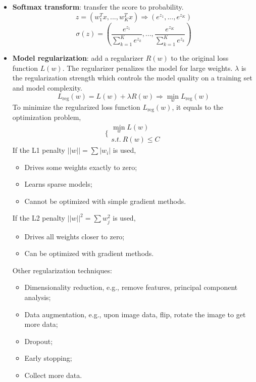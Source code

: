 \documentclass[]{article}
\begin{document}
\begin{itemize}
\begin{itemize}
		\item \textbf{Softmax transform}: transfer the score to probability.
		\begin{equation}
		z=(w_1^Tx, ..., w_K^Tx)\Rightarrow (e^{z_1}, ..., e^{z_K})
		\end{equation}
		\begin{equation}
		\sigma (z)=\left(\frac{e^{z_1}}{\sum_{k=1}^{K}e^{z_k}}, ...,\frac{e^{z_K}}{\sum_{k=1}^{K}e^{z_k}} \right)
		\end{equation}
		
		\item \textbf{Model regularization}: add a regularizer $R(w)$ to the original loss function $L(w)$. The regularizer penalizes the model for large weights. $\lambda$ is the regularization strength which controls the model quality on a training set and model complexity.
		\begin{equation}
		L_{\mathrm{reg}}(w)=L(w)+\lambda R(w)\Rightarrow \min_{w}{L_{\mathrm{reg}}(w)}
		\end{equation}
		To minimize the regularized loss function $L_{\mathrm{reg}}(w)$, it equals to the optimization problem,
		\begin{equation}
		\{
		\begin{array}{c}
		\min_{w}{L(w)} \\
		s.t.\ R(w) \leq C
		\end{array}
		\end{equation}
		If the L1 penalty $||w||=\sum{|w_i|}$ is used,
		\begin{itemize}
			\item Drives some weights exactly to zero;
			\item Learns sparse models;
			\item Cannot be optimized with simple gradient methods.
		\end{itemize}
		If the L2 penalty $||w||^2=\sum{w_j^2}$ is used,
		\begin{itemize}
			\item Drives all weights closer to zero;
			\item Can be optimized with gradient methods.
		\end{itemize}
		Other regularization techniques:
		\begin{itemize}
			\item Dimensionality reduction, e.g., remove features, principal component analysis;
			\item Data augmentation, e.g., upon image data, flip, rotate the image to get more data;
			\item Dropout;
			\item Early stopping;
			\item Collect more data.
		\end{itemize}
		

\end{itemize}
\end{itemize}
\end{document}
